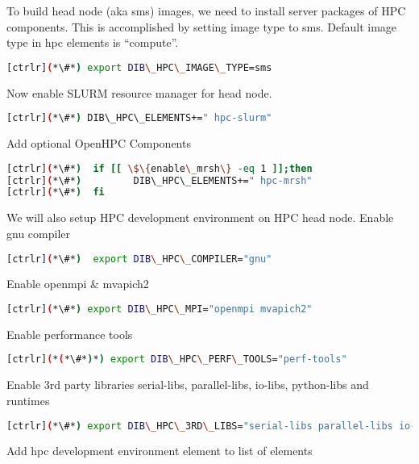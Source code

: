 To build head node (aka sms) images, we need to install server packages of HPC components. This is accomplished by setting image type to sms. Default image type in hpc elements is “compute”.

\begin{lstlisting}[language=bash,keywords={}]
[ctrlr](*\#*) export DIB\_HPC\_IMAGE\_TYPE=sms
\end{lstlisting}

Now enable SLURM resource manager for head node.

\begin{lstlisting}[language=bash,keywords={}]
[ctrlr](*\#*) DIB\_HPC\_ELEMENTS+=" hpc-slurm"
\end{lstlisting}

Add optional OpenHPC Components

\begin{lstlisting}[language=bash,keywords={}]
[ctrlr](*\#*)  if [[ \$\{enable\_mrsh\} -eq 1 ]];then
[ctrlr](*\#*)         DIB\_HPC\_ELEMENTS+=" hpc-mrsh"
[ctrlr](*\#*)  fi
\end{lstlisting}

We will also setup HPC development environment on HPC head node. 
Enable gnu compiler

\begin{lstlisting}[language=bash,keywords={}]
[ctrlr](*\#*)  export DIB\_HPC\_COMPILER="gnu"
\end{lstlisting}

Enable openmpi \& mvapich2

\begin{lstlisting}[language=bash,keywords={}]
[ctrlr](*\#*) export DIB\_HPC\_MPI="openmpi mvapich2"
\end{lstlisting}

Enable performance tools

\begin{lstlisting}[language=bash,keywords={}]
[ctrlr](*(*\#*)*) export DIB\_HPC\_PERF\_TOOLS="perf-tools"
\end{lstlisting}

Enable 3rd party libraries serial-libs, parallel-libs, io-libs, python-libs and runtimes

\begin{lstlisting}[language=bash,keywords={}]
[ctrlr](*\#*) export DIB\_HPC\_3RD\_LIBS="serial-libs parallel-libs io-libs python-libs runtimes"
\end{lstlisting}

Add hpc development environment element to list of elements

